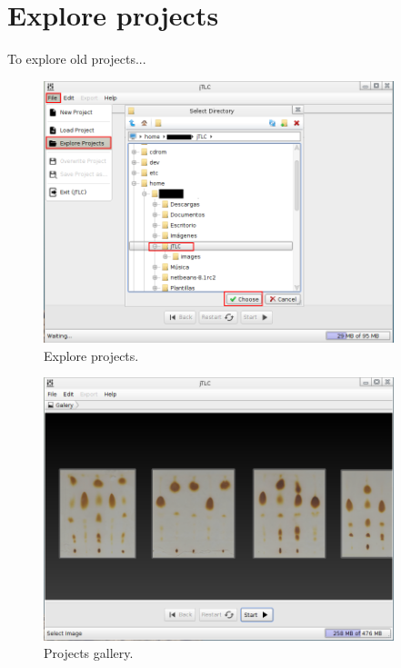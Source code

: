 \section{Explore projects}
To explore old projects...
\begin{figure}[H]
	\vspace{0cm}
	\centering
	\includegraphics[width=385px]{imagenes/explore_projects}
	\centering
	\vspace{-0.4cm}
	\caption{Explore projects.}
	\label{fig:explore_projects}
	\vspace{-0.25cm}
\end{figure}

\begin{figure}[H]
	\vspace{0cm}
	\centering
	\includegraphics[width=385px]{imagenes/gallery}
	\centering
	\vspace{-0.4cm}
	\caption{Projects gallery.}
	\label{fig:gallery}
	\vspace{-0.25cm}
\end{figure}
\newpage

